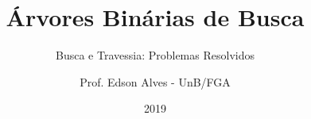 \title{Árvores Binárias de Busca}
\subtitle{Busca e Travessia: Problemas Resolvidos}
\author{Prof. Edson Alves - UnB/FGA}
\date{2019}
